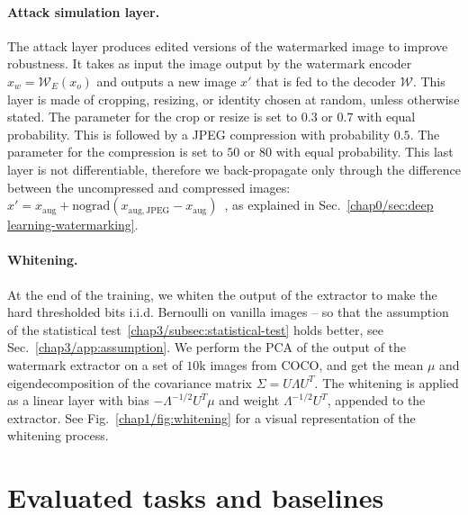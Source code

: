 \paragraph*{Attack simulation layer.}\label{chap3/app:hidden-attack}
The attack layer produces edited versions of the watermarked image to improve robustness.
It takes as input the image output by the watermark encoder $x_w = \mathcal{W}_E(x_o)$ and outputs a new image $x'$ that is fed to the decoder $\mathcal{W}$.
This layer is made of cropping, resizing, or identity chosen at random, unless otherwise stated.
The parameter for the crop or resize is set to $0.3$ or $0.7$ with equal probability.
This is followed by a JPEG compression with probability $0.5$.
The parameter for the compression is set to $50$ or $80$ with equal probability.
This last layer is not differentiable, therefore we back-propagate only through the difference between the uncompressed and compressed images:
$x'= x_{\mathrm{aug}} + \mathrm{nograd}(x_{\mathrm{aug}, \mathrm{JPEG}} - x_{\mathrm{aug}})$~\citep{zhang2021asl}, as explained in Sec.~\ref{chap0/sec:deep learning-watermarking}.

\paragraph*{Whitening.}\label{chap3/app:hidden-centering}
At the end of the training, we whiten the output of the extractor to make the hard thresholded bits i.i.d. Bernoulli on vanilla images -- so that the assumption of the statistical test~\ref{chap3/subsec:statistical-test} holds better, see Sec.~\ref{chap3/app:assumption}.
We perform the PCA of the output of the watermark extractor on a set of $10$k images from COCO, and get the mean $\mu$ and eigendecomposition of the covariance matrix $\Sigma= U\Lambda U^T$. 
The whitening is applied as a linear layer with bias $-\Lambda^{-1/2}U^T\mu$ and weight $\Lambda^{-1/2}U^T$, appended to the extractor. 
See Fig.~\ref{chap1/fig:whitening} for a visual representation of the whitening process.


















\section{Evaluated tasks and baselines}\label{chap3/app:implementation-details}

